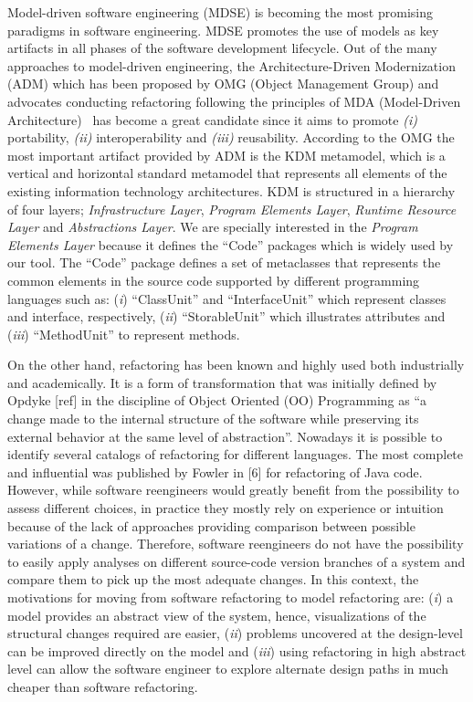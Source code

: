 Model-driven software engineering (MDSE) is becoming the most promising paradigms in software engineering. MDSE promotes the use of models as key artifacts in all phases of the software development lifecycle. Out of the many approaches to model-driven engineering, the Architecture-Driven Modernization (ADM) which has been proposed by OMG (Object Management Group) and advocates conducting refactoring following the principles of MDA (Model-Driven Architecture)~\cite{Ulrich:2010:IST:1841736} has become a great candidate since it aims to promote \textit{(i)} portability, \textit{(ii)} interoperability and \textit{(iii)} reusability. According to the OMG the most important artifact provided by ADM is the KDM metamodel, which is a vertical and horizontal standard metamodel that represents all elements of the existing information  technology architectures. KDM is structured in a hierarchy of four layers; \textit{Infrastructure Layer}, \textit{Program Elements Layer}, \textit{ Runtime Resource Layer} and \textit{Abstractions Layer}. We are specially interested in the \textit{Program Elements Layer} because it defines the ``Code'' packages which is widely used by our tool. The ``Code'' package defines a set of metaclasses that represents the common elements in the source code supported by different programming languages such as: (\textit{i}) ``ClassUnit'' and ``InterfaceUnit'' which represent classes and interface, respectively, (\textit{ii}) ``StorableUnit'' which illustrates attributes and (\textit{iii}) ``MethodUnit'' to represent methods. 

On the other hand, refactoring has been known and highly used both industrially and academically. It is a form of transformation that was initially defined by Opdyke [ref] in the discipline of Object Oriented (OO) Programming as ``a change made to the internal structure of the software while preserving its external behavior at the same level of abstraction''. Nowadays it is possible to identify several catalogs of refactoring for different languages. The most complete and influential was published by Fowler in [6] for refactoring of Java code. 
However, while software reengineers would greatly benefit from the possibility to assess different choices, in practice they mostly rely on experience or intuition because of the lack of approaches providing comparison between possible variations of a change. 
Therefore, software reengineers do not have the possibility to easily apply analyses on different source-code version branches of a system and compare them to pick up the most adequate changes. In this context, the motivations for moving from software refactoring  to model refactoring are: 
(\textit{i}) a model provides an abstract view of the system, hence, visualizations of the structural changes required are easier, 
(\textit{ii}) problems uncovered at the design-level can be improved directly on the model and 
(\textit{iii}) using refactoring in high abstract level can allow the software engineer to explore alternate design paths in much cheaper than software refactoring.

